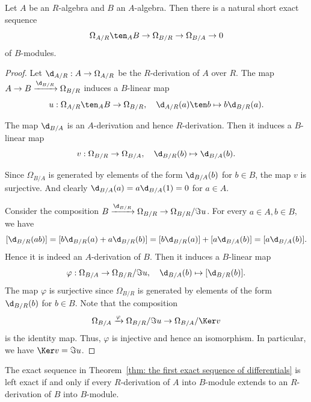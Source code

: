     \begin{theorem}\label{thm: the first exact sequence of differentials}
        Let \(A\) be an \(R\)-algebra and \(B\) an \(A\)-algebra. 
        Then there is a natural short exact sequence
        \[ \Omega_{A/R} \ten_A B \to \Omega_{B/R} \to \Omega_{B/A} \to 0 \]
        of \(B\)-modules.
    \end{theorem}
    \begin{proof}
        Let \(\d_{A/R}: A \to \Omega_{A/R}\) be the \(R\)-derivation of \(A\) over \(R\).
        The map \(A \to B \xrightarrow{\d_{B/R}} \Omega_{B/R}\) induces a \(B\)-linear map 
        \[ u: \Omega_{A/R} \ten_A B \to \Omega_{B/R}, \quad \d_{A/R}(a) \ten b \mapsto b\d_{B/R}(a). \]
        
        The map \(\d_{B/A}\) is an \(A\)-derivation and hence \(R\)-derivation.
        Then it induces a \(B\)-linear map 
        \[ v: \Omega_{B/R} \to \Omega_{B/A}, \quad \d_{B/R}(b) \mapsto \d_{B/A}(b). \]

        Since \(\Omega_{B/A}\) is generated by elements of the form \(\d_{B/A}(b)\) for \(b \in B\),
        the map \(v\) is surjective.
        And clearly \(\d_{B/A}(a) = a\d_{B/A}(1) = 0\) for \(a \in A\). 

        Consider the composition \( B \xrightarrow{\d_{B/R}} \Omega_{B/R} \to \Omega_{B/R}/\Im u\).
        For every \(a \in A, b\in B\), we have 
        \[ [\d_{B/R}(ab)] = [b\d_{B/R}(a) + a\d_{B/R}(b)] = [b\d_{B/R}(a)] + [a\d_{B/A}(b)] = [a\d_{B/A}(b)]. \]
        Hence it is indeed an \(A\)-derivation of \(B\).
        Then it induces a \(B\)-linear map 
        \[ \varphi: \Omega_{B/A} \to \Omega_{B/R}/\Im u, \quad \d_{B/A}(b) \mapsto [\d_{B/R}(b)]. \]
        The map \(\varphi\) is surjective since \(\Omega_{B/R}\) is generated by elements of the form \(\d_{B/R}(b)\) for \(b \in B\).
        Note that the composition 
        \[ \Omega_{B/A} \xrightarrow{\varphi} \Omega_{B/R}/\Im u \to \Omega_{B/A}/\Ker v \]
        is the identity map.
        Thus, \(\varphi\) is injective and hence an isomorphism.
        In particular, we have \(\Ker v = \Im u\).
    \end{proof}

    \begin{remark}\label{rmk: the first exact sequence of differentials is left exact}
        The exact sequence in Theorem~\ref{thm: the first exact sequence of differentials} is left exact 
        if and only if every \(R\)-derivation of \(A\) into \(B\)-module extends to an \(R\)-derivation of \(B\) into \(B\)-module.
        
    \end{remark}


